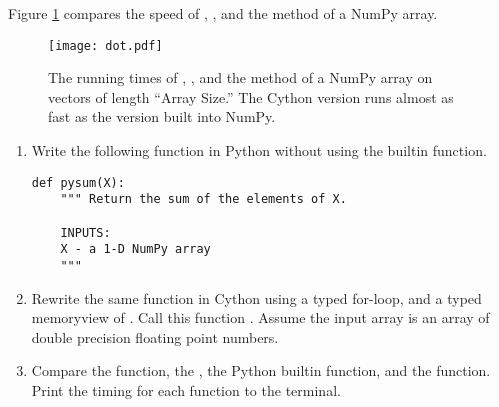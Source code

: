 Figure \ref{cython:dot} compares the speed of , , and the  method of a NumPy array.



\begin{figure}
\centering
\texttt{[image: dot.pdf]}
\caption{The running times of , , and the  method of a NumPy array on vectors of length ``Array Size.''
The Cython version runs almost as fast as the version built into NumPy.}
\label{cython:dot}
\end{figure}

\begin{problem} \label{prob:add}
\leavevmode
\begin{enumerate}
\item Write the following function in Python without using the  builtin function.
\begin{lstlisting}
def pysum(X):
    """ Return the sum of the elements of X.

    INPUTS:
    X - a 1-D NumPy array
    """
\end{lstlisting}

\item Rewrite the same function in Cython using a typed for-loop, and a typed memoryview of . Call this function . Assume the input array  is an array of double precision floating point numbers.

\item Compare the  function, the , the Python builtin  function, and the  function. Print the timing for each function to the terminal.
\end{enumerate}
\end{problem}

